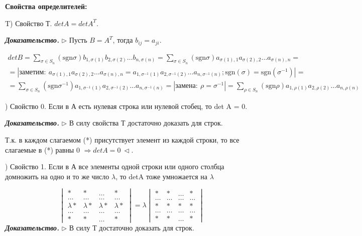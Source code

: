 \bigskip
\textbf{Свойства определителей:}

\bigskip
T) Свойство Т. $detA = detA^T$.

\bigskip
\textbf{\textit{Доказательство.}} $\rhd$
Пусть $B = A^T$, тогда $b_{ij} = a_{ji}$. 

\begin{multline} detB = \sum\limits_{\sigma \in S_n} (\mathrm{sgn} \sigma) b_{1, \sigma(1)} b_{2, \sigma(2)} \dots b_{n, \sigma(n)} = \sum\limits_{\sigma \in S_n} (\mathrm{sgn} \sigma) a_{\sigma(1), 1} a_{\sigma(2), 2} \dots a_{\sigma(n), n} = \\ = | заметим: \ a_{\sigma (1) , 1} a_{\sigma (2), 2} \dots a_{\sigma (n), n} = a_{1, \sigma^{-1} (1)} a_{2, \sigma^{-1} (2)} \dots a_{n, \sigma^{-1} (n)}; \mathrm{sgn}(\sigma) = \mathrm{sgn}(\sigma^{-1}) | = \\ = \sum\limits_{\sigma \in S_n} (\mathrm{sgn} \sigma^{-1}) a_{1, \sigma^{-1}(1)} a_{2, \sigma^{-1}(2)} \dots a_{n, \sigma^{-1}(n)} = |замена: \ \rho = \sigma^{-1} | = \sum\limits_{\rho \in S_n} (\mathrm{sgn} \rho) a_{1, \rho(1)} a_{2, \rho(2)} \dots a_{n, \rho(n)} \end{multline}

) Свойство 0. Если в А есть нулевая строка или нулевой стобец, то det A = 0.

\bigskip
\textbf{\textit{Доказательство.}} $\rhd$ В силу свойства Т достаточно доказать для строк.

Т.к. в каждом слагаемом (*) присутствует элемент из каждой строки, то все слагаемые в (*) равны 0 $\Rightarrow detA = 0 \ \lhd$.

) Свойство 1. Если в А все элементы одной строки или одного столбца домножить на одно и то же число $\lambda$, то detA тоже умножается на $\lambda$

\begin{equation*}
\begin{vmatrix} * & * & \dots & * \\ \dots & \dots & \dots & \dots \\ \lambda * & \lambda * & \lambda * & \lambda * \\ \dots & \dots & \dots & \dots \\ * & * & \dots & * \end{vmatrix} = \lambda \begin{vmatrix} * & * & \dots & * \\ \dots & \dots & \dots & \dots \\  * &  * & * & * \\ \dots & \dots & \dots & \dots \\ * & * & \dots & * \end{vmatrix}
\end{equation*}
\textbf{\textit{Доказательство.}} $\rhd$ В силу Т достаточно доказать для строк. 

